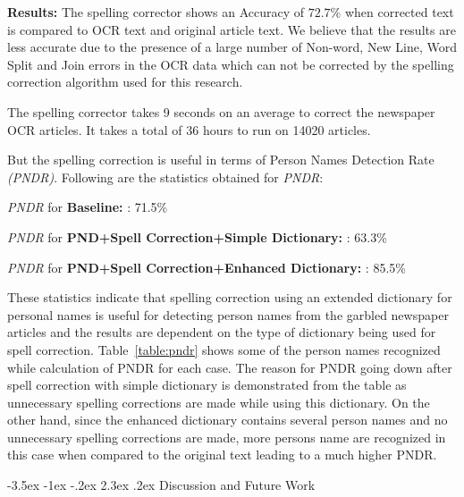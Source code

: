 \documentclass[12pt]{article}
\makeatletter
\renewcommand\section{\@startsection{section}{1}{\z@}%
                                  {-3.5ex \@plus -1ex \@minus -.2ex}%
                                  {2.3ex \@plus.2ex}%
                                  {\normalfont\bfseries}}
\makeatother
\begin{document}
\noindent \textbf{Results: }
The spelling corrector shows an Accuracy of $72.7 \%$  when corrected text is compared to OCR text and original article text. We believe that the results are less accurate due to the presence of a large number of Non-word, New Line, Word Split and Join errors in the OCR data which can not be corrected by the spelling correction algorithm used for this research.

The spelling corrector takes 9 seconds on an average to correct the newspaper OCR articles. It takes a total of 36 hours to run on 14020 articles.


But the spelling correction is useful in terms of Person Names Detection Rate \textit{(PNDR)}. Following are the statistics obtained for \textit{PNDR}:

\textit{PNDR} for \textbf{Baseline: }: 71.5\% 

\textit{PNDR} for \textbf{PND+Spell Correction+Simple Dictionary: }: 63.3\% 

\textit{PNDR} for \textbf{PND+Spell Correction+Enhanced Dictionary: }: 85.5\% 

These statistics indicate that spelling correction using an extended dictionary for personal names is useful for detecting person names from the garbled newspaper articles and the results are dependent on the type of dictionary being used for spell correction.
 Table~\ref{table:pndr} shows some of the person names recognized while calculation of PNDR for each case. The reason for PNDR going down after spell correction with simple dictionary is demonstrated from the table as unnecessary spelling corrections are made while using this dictionary. On the other hand, since the enhanced dictionary contains several person names and no unnecessary spelling corrections are made, more persons name are recognized in this case when compared to the original text leading to a much higher PNDR. 

\section{Discussion and Future Work}
\label{spell:discussion}
\end{document}
